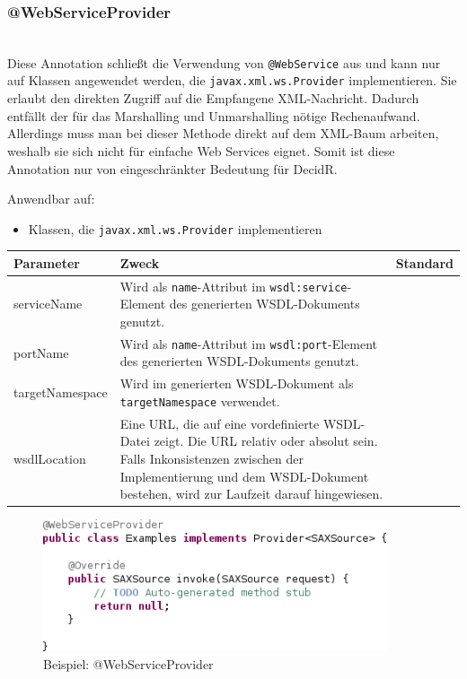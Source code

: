 \documentclass[runningheads]{llncs}
\newcommand{\germanquote}[1]{\glqq{}#1\grqq{}}
\newcommand{\decidr}{DecidR}
\newcommand{\anntabwidth}{\textwidth}
\begin{document}
    \subsubsection{@WebServiceProvider}\ \\
      \nocite{impl_wsprov}
      Diese Annotation schließt die Verwendung von \texttt{@WebService} aus und kann nur auf
      Klassen angewendet werden, die \texttt{javax.xml.ws.Provider} implementieren. Sie erlaubt den
      direkten Zugriff auf die Empfangene XML-Nachricht. Dadurch entfällt der für das Marshalling
      und Unmarshalling nötige Rechenaufwand. Allerdings muss man bei dieser Methode direkt auf dem
      XML-Baum arbeiten, weshalb sie sich nicht für einfache Web Services eignet. Somit ist diese
      Annotation nur von eingeschränkter Bedeutung für \decidr{}.

      \noindent{}Anwendbar auf:
      \begin{itemize}
       \item Klassen, die \texttt{javax.xml.ws.Provider} implementieren\vfill
      \end{itemize}
      \tymin=75pt
    \begin{tabulary}{\anntabwidth}{|l|L|L|}
    \hline
    \textbf{Parameter} & \textbf{Zweck} & \textbf{Standard} \\
    \hline
      serviceName &
      Wird als \texttt{name}-Attribut im \texttt{wsdl:service}-Element des generierten
      WSDL-\linebreak[0]Dokuments genutzt. &
      \germanquote{} \\
    \hline
      portName &
      Wird als \texttt{name}-Attribut im \texttt{wsdl:port}-Element des generierten
      WSDL-\linebreak[0]Dokuments genutzt. &
      \germanquote{} \\
    \hline
      targetNamespace &
      Wird im generierten WSDL-Dokument als \texttt{targetNamespace} verwendet. &
      \germanquote{} \\
    \hline
      wsdlLocation &
      Eine URL, die auf eine vordefinierte WSDL-Datei zeigt. Die URL relativ oder absolut sein.
      Falls Inkonsistenzen zwischen der Implementierung und dem WSDL-Dokument bestehen, wird zur
      Laufzeit darauf hingewiesen. &
      \germanquote{} \\
    \hline
    \end{tabulary} \vfill
    \tymin=10pt
    \begin{figure}[tbh]
      \centering
      \includegraphics[width=0.9\textwidth]{../images/AtWebServiceProvider.png}
      \caption{Beispiel: @WebServiceProvider}
      \label{fig:wsp}
    \end{figure}
\end{document}
